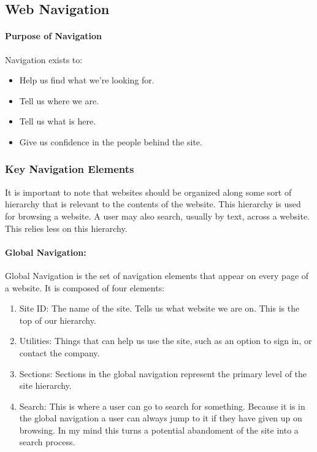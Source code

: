 \documentclass{article}%
\begin{document}
  \subsection{Web Navigation}
    \paragraph{Purpose of Navigation}
    Navigation exists to:
    \begin{itemize}
      \item Help us find what we're looking for.
      \item Tell us where we are.
      \item Tell us what is here.
      \item Give us confidence in the people behind the site.
    \end{itemize}
  \subsubsection{Key Navigation Elements}
    It is important to note that websites should be organized along some sort of hierarchy
    that is relevant to the contents of the website. This hierarchy is used for browsing
    a website. A user may also search, usually by text, across a website. This relies less
    on this hierarchy.
    \paragraph{Global Navigation:}
      Global Navigation is the set of navigation elements that appear on every
      page of a website. It is composed of four elements:
      \begin{enumerate}
        \item Site ID: The name of the site. Tells us what website we are on. This is the top of our hierarchy.
        \item Utilities: Things that can help us use the site, such as an option to sign in, or contact the company.
        \item Sections: Sections in the global navigation represent the primary level of the site hierarchy.
        \item Search: This is where a user can go to search for something. Because it is in the global navigation a user
                      can always jump to it if they have given up on browsing. In my mind this turns a potential
                      abandoment of the site into a search process.
      \end{enumerate}
\end{document}
